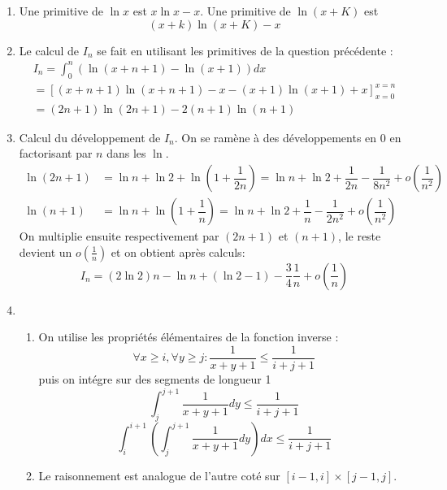 \begin{enumerate}
 \item Une primitive de $\ln x$ est $x\ln x -x$. Une primitive de $\ln(x+K)$ est
\begin{displaymath}
 (x+k)\ln(x+K)-x
\end{displaymath}
\item Le calcul de $I_n$ se fait en utilisant les primitives de la question précédente :
\begin{multline*}
 I_n = \int_{0}^n \left( \ln(x+n+1) -\ln(x+1)\right) dx \\
 = \left[ (x+n+1)\ln(x+n+1)-x - (x+1)\ln(x+1)+ x\right]_{x=0}^{x=n}\\
= (2n+1)\ln(2n+1) - 2(n+1)\ln(n+1) 
\end{multline*}
\item Calcul du développement de $I_n$. On se ramène à des développements en $0$ en factorisant par $n$ dans les $\ln$.
\begin{align*}
 \ln(2n+1) &= \ln n + \ln 2 +\ln\left(1+\dfrac{1}{2n} \right)
=  \ln n + \ln 2 +\dfrac{1}{2n} -\dfrac{1}{8n^2}+o(\dfrac{1}{n^2}) \\
\ln(n+1) &= \ln n  +\ln\left(1+\dfrac{1}{n} \right)
=  \ln n + \ln 2 +\dfrac{1}{n} -\dfrac{1}{2n^2}+o(\dfrac{1}{n^2})
\end{align*}
On multiplie ensuite respectivement par $(2n+1)$ et $(n+1)$, le reste devient un $o(\frac{1}{n})$ et on obtient après calculs:
\begin{displaymath}
 I_n = (2\ln 2)n -\ln n + (\ln 2 -1) -\dfrac{3}{4}\dfrac{1}{n}+o(\dfrac{1}{n})
\end{displaymath}
\item \begin{enumerate}
 \item On utilise les propriétés élémentaires de la fonction inverse  :
\begin{displaymath}
 \forall x\geq i, \forall y \geq j : 
\dfrac{1}{x+y+1} \leq \dfrac{1}{i+j+1} 
\end{displaymath}
 puis on intégre sur des segments de longueur 1
\begin{displaymath}
 \int _{j}^{j+1} \dfrac{1}{x+y+1}dy \leq \dfrac{1}{i+j+1}
\end{displaymath}
\begin{displaymath}
 \int_{i}^{i+1}\left( \int _{j}^{j+1} \dfrac{1}{x+y+1}dy\right) dx \leq \dfrac{1}{i+j+1}
\end{displaymath}
\item Le raisonnement est analogue de l'autre coté sur $[i-1,i]\times[j-1,j]$.


\end{enumerate}
\end{enumerate}
